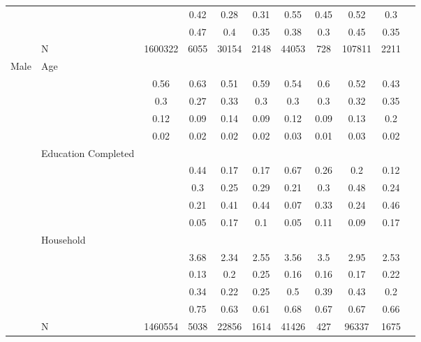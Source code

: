 \begin{table}[ht]
\begin{tabular}{l>{\raggedright\arraybackslash}p{3.2cm}|ccccccccc}
   & \multicolumn{1}{>{\raggedleft\arraybackslash}p{2.9cm}|}{\makebox[2.9cm][r]{Lives with Child }} &  & 0.42 & 0.28 & 0.31 & 0.55 & 0.45 & 0.52 & 0.3 \\ 
   & \multicolumn{1}{>{\raggedleft\arraybackslash}p{3.4cm}|}{\makebox[3.4cm][r]{Married/Cohabiting }} &  & 0.47 & 0.4 & 0.35 & 0.38 & 0.3 & 0.45 & 0.35 \\ 
   & N & 1600322 & 6055 & 30154 & 2148 & 44053 & 728 & 107811 & 2211 \\ 
  Male & Age &  &  &  &  &  &  &  &  \\ 
   & \multicolumn{1}{>{\raggedleft\arraybackslash}p{1.5cm}|}{\makebox[1.5cm][r]{60 - 69 }} & 0.56 & 0.63 & 0.51 & 0.59 & 0.54 & 0.6 & 0.52 & 0.43 \\ 
   & \multicolumn{1}{>{\raggedleft\arraybackslash}p{1.5cm}|}{\makebox[1.5cm][r]{70 - 79 }} & 0.3 & 0.27 & 0.33 & 0.3 & 0.3 & 0.3 & 0.32 & 0.35 \\ 
   & \multicolumn{1}{>{\raggedleft\arraybackslash}p{1.5cm}|}{\makebox[1.5cm][r]{80 - 89 }} & 0.12 & 0.09 & 0.14 & 0.09 & 0.12 & 0.09 & 0.13 & 0.2 \\ 
   & \multicolumn{1}{>{\raggedleft\arraybackslash}p{1.5cm}|}{\makebox[1.5cm][r]{90 plus }} & 0.02 & 0.02 & 0.02 & 0.02 & 0.03 & 0.01 & 0.03 & 0.02 \\ 
   & Education Completed &  &  &  &  &  &  &  &  \\ 
   & \multicolumn{1}{>{\raggedleft\arraybackslash}p{3.2cm}|}{\makebox[3.2cm][r]{Less than Primary }} &  & 0.44 & 0.17 & 0.17 & 0.67 & 0.26 & 0.2 & 0.12 \\ 
   & \multicolumn{1}{>{\raggedleft\arraybackslash}p{1.7cm}|}{\makebox[1.7cm][r]{Primary }} &  & 0.3 & 0.25 & 0.29 & 0.21 & 0.3 & 0.48 & 0.24 \\ 
   & \multicolumn{1}{>{\raggedleft\arraybackslash}p{2cm}|}{\makebox[2cm][r]{Secondary }} &  & 0.21 & 0.41 & 0.44 & 0.07 & 0.33 & 0.24 & 0.46 \\ 
   & \multicolumn{1}{>{\raggedleft\arraybackslash}p{2cm}|}{\makebox[2cm][r]{University }} &  & 0.05 & 0.17 & 0.1 & 0.05 & 0.11 & 0.09 & 0.17 \\ 
   & Household &  &  &  &  &  &  &  &  \\ 
   & \multicolumn{1}{>{\raggedleft\arraybackslash}p{2.7cm}|}{\makebox[2.7cm][r]{Household Size }} &  & 3.68 & 2.34 & 2.55 & 3.56 & 3.5 & 2.95 & 2.53 \\ 
   & \multicolumn{1}{>{\raggedleft\arraybackslash}p{2.2cm}|}{\makebox[2.2cm][r]{Lives Alone }} &  & 0.13 & 0.2 & 0.25 & 0.16 & 0.16 & 0.17 & 0.22 \\ 
   & \multicolumn{1}{>{\raggedleft\arraybackslash}p{2.9cm}|}{\makebox[2.9cm][r]{Lives with Child }} &  & 0.34 & 0.22 & 0.25 & 0.5 & 0.39 & 0.43 & 0.2 \\ 
   & \multicolumn{1}{>{\raggedleft\arraybackslash}p{3.4cm}|}{\makebox[3.4cm][r]{Married/Cohabiting }} &  & 0.75 & 0.63 & 0.61 & 0.68 & 0.67 & 0.67 & 0.66 \\ 
   & N & 1460554 & 5038 & 22856 & 1614 & 41426 & 427 & 96337 & 1675 \\ 
   \hline
\end{tabular}
\endgroup
\end{table}
